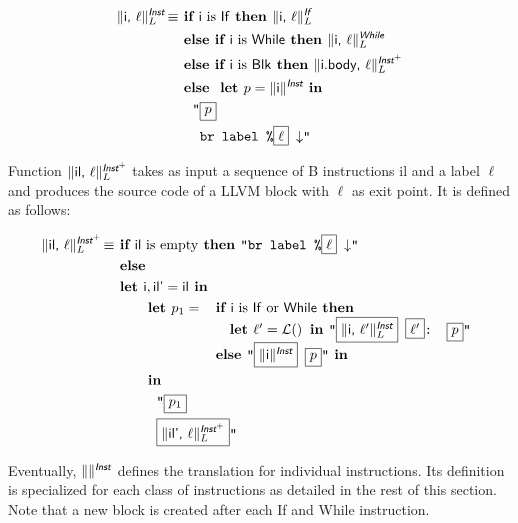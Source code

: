 \documentclass{llncs}
\newcommand{\trad}[2]{\ensuremath{\lVert \textsf{#1} \rVert^{\textit{#2}}}}
\newcommand{\nl}[0]{\ensuremath{\downarrow}}
\DeclareMathOperator{\isdef}{\equiv}
\DeclareMathOperator{\lbl}{\mathcal{L}()}
\newcommand{\llvm}[1]{\texttt{#1}}
\newcommand{\B}[1]{\textsf{#1}}
\newcommand{\ListOf}[1]{$\mbox{#1}^+$}
\newcommand{\IF}[0]{\textbf{ if }}
\newcommand{\ELSIF}[0]{\textbf{ else if }}
\newcommand{\ELSE}[0]{\textbf{ else }}
\newcommand{\THEN}[0]{\textbf{ then }}
\newcommand{\LET}[0]{\textbf{ let }}
\newcommand{\IN}[0]{\textbf{ in }}
\newcommand{\PH}[1]{\framebox{$#1$}}
\begin{document}
\begin{align*}
\trad{\B{i}, $\ell$}{\B{Inst}}_L \isdef
& \IF \B{i} \mbox{ is \B{If}} \THEN \trad{\B{i}, $\ell$}{\B{If}}_L \\
& \ELSIF \B{i} \mbox{ is \B{While}} \THEN \trad{\B{i}, $\ell$}{\B{While}}_L \\
& \ELSIF \B{i} \mbox{ is \B{Blk}} \THEN \trad{\B{i.body}, $\ell$}{\ListOf{\B{Inst}}}_L \\
& \ELSE \LET p = \trad{\B{i}}{\B{Inst}} \IN \\
& \quad \llvm{"\PH{p}} \\
& \quad \llvm{ br label \%\PH{\ell} \nl"}
\end{align*}

Function $\trad{\B{il}, $\ell$}{\ListOf{\B{Inst}}}_L$ takes as input a sequence
of B instructions \B{il} and a label $\ell$ and produces the source code of a
LLVM block with $\ell$ as exit point. It is defined as follows:

\begin{align*}
\trad{\B{il}, $\ell$}{\ListOf{\B{Inst}}}_L \isdef & \IF \B{il} \mbox{ is empty} \THEN \llvm{"br label \%\PH{\ell} \nl"} \\
& \ELSE \\
& \LET \B{i}, \B{il'} = \B{il}  \IN \\
& \quad \quad \LET p_1 =
\begin{array}[t]{l}
  \IF \B{i} \mbox{ is \B{If} or \B{While}} \THEN \\
  \quad \LET \ell' = \lbl \IN \llvm{"\PH{\trad{i, $\ell'$}{\B{Inst}}_L} \PH{\ell'}: \PH{p}"} \\
  \ELSE \llvm{"\PH{\trad{i}{\B{Inst}}} \PH{p}"} \IN
\end{array} \\
& \quad \quad \IN \\
& \quad \quad \quad \llvm{"\PH{p_1}} \\
& \quad \quad \quad \llvm{\PH{\trad{il', $\ell$}{\ListOf{\B{Inst}}}_L}"}
\end{align*}

Eventually, $\trad{}{\B{Inst}}$ defines the translation for individual
instructions. Its definition is specialized for each class of instructions as
detailed in the rest of this section. Note that a new block is created after
each \B{If} and \B{While} instruction.
\end{document}

